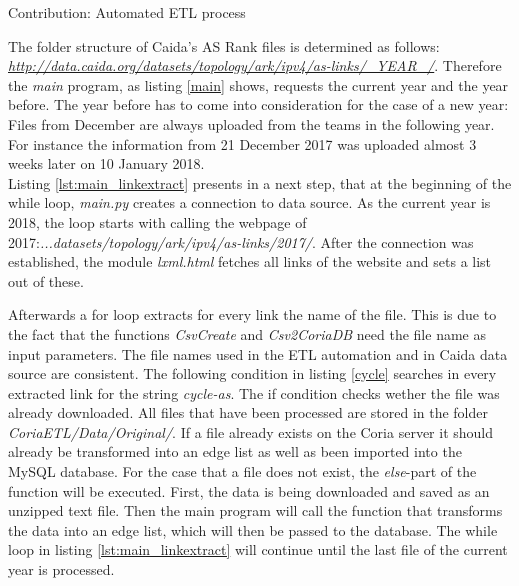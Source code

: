 \documentclass[conference, 11pt]{IEEEtran}
\begin{document}
\begin{subsection}{Contribution: Automated ETL process}
\vspace{0.2cm}

\vspace{0.5cm}


The folder structure of Caida's AS Rank files is determined as follows:  \textit{\url{http://data.caida.org/datasets/topology/ark/ipv4/as-links/_YEAR_/}}. Therefore the \textit{main} program, as listing \ref{main} shows, requests the current year and the year before. The year before has to come into consideration for the case of a new year: Files from December are always uploaded from the teams in the following year. For instance the information from 21 December 2017 was uploaded almost 3 weeks later on 10 January 2018. \\ 

Listing \ref{lst:main_linkextract} presents in a next step, that at the beginning of the while loop, \textit{main.py} creates a connection to data source. As the current year is 2018, the loop starts with calling the webpage of 2017:\textit{...datasets/topology/ark/ipv4/as-links/2017/}. After the connection was established, the module \textit{lxml.html} fetches all links of the website and sets a list out of these. \\ 

\vspace{0.3cm}

\vspace{0.3cm}

Afterwards a for loop extracts for every link the name of the file. This is due to the fact that the functions \textit{CsvCreate} and \textit{Csv2CoriaDB} need the file name as input parameters. The file names used in the ETL automation and in Caida data source are consistent. The following condition in listing \ref{cycle} searches in every extracted link for the string \textit{cycle-as}. The if condition checks wether the file was already downloaded. All files that have been processed are stored in the folder \textit{CoriaETL/Data/Original/}. If a file already exists on the Coria server it should already be transformed into an edge list as well as been imported into the MySQL database. For the case that a file does not exist, the \textit{else}-part of the function will be executed. First, the data is being downloaded and saved as an unzipped text file. 
Then the main program will call the function that transforms the data into an edge list, which will then be passed to the database. 
The while loop in listing \ref{lst:main_linkextract} will continue until the last file of the current year is processed.  \\


\end{subsection}
\end{document}
